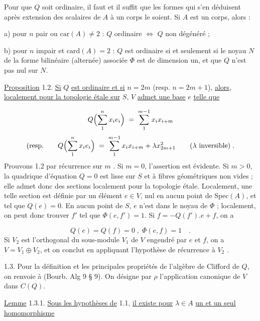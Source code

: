 Pour que $Q$ soit ordinaire, il faut et il suffit que les formes qui s'en déduisent après extension des scalaires de $A$ à un corps le soient. Si $A$ est un corps, alors :

a) pour $n$ pair ou $\mathrm{car}(A) \neq 2$ : $Q$ ordinaire $\Longleftrightarrow$ $Q$ non dégénéré ;

b) pour $n$ impair et $\mathrm{card}(A) = 2$ : $Q$ est ordinaire si et seulement si le noyau $N$ de la forme bilinéaire (alternée) associée $\Phi$ est de dimension un, et que $Q$ n'est pas nul sur $N$.

\underline{Proposition} 1.2. \underline{Si} $Q$ \underline{est ordinaire et si} $n = 2m$ (resp. $n = 2m +1$), \underline{alors}, \underline{localement pour la topologie étale sur} $S$, $V$ \underline{admet une base} \underline{$e$} \underline{telle que} 



\begin{equation*}
 Q\Bigl( \sum_{1}^{n} x_i e_i \Bigr) \;=\; \sum_{1}^{m-1} x_i x_{i+m}
\end{equation*}
\begin{equation*}
\text{(resp.} \qquad Q\Bigl( \sum_{1}^{n} x_i e_i \Bigr) \;=\; \sum_{1}^{m-1} x_i x_{i+m} + \lambda x_{2m+1}^{2} \qquad (\lambda \text{ inversible}) \;.
\end{equation*}
Prouvons 1.2 par récurrence sur $m$ . Si $m = 0$, l'assertion est évidente. Si $m > 0$, la quadrique d'équation $Q = 0$ est lisse sur $S$ et à fibres géométriques non vides ; elle admet donc des sections localement pour la topologie étale. Localement, une telle section est définie par un élément $e \in V$, nul en aucun point de $\mathrm{Spec}(A)$, et tel que $Q(e) = 0$. En aucun point de $S$, $e$ n'est dans le noyau de $\Phi$ ; localement, on peut donc trouver $f'$ tel que $\Phi(e,f') = 1$. Si $f = -Q(f').e+f$, on a

\begin{equation*}
Q(e) = Q(f) = 0 \;,\; \Phi(e,f) = 1 \quad .
\end{equation*}
Si $V_2$ est l'orthogonal du sous-module $V_1$ de $V$ engendré par $e$ et $f$, on a $V = V_1 \oplus V_2$, et on conclut en appliquant l'hypothèse de récurrence à $V_2$ .

1.3. Pour la définition et les principales propriétés de l'algèbre de Clifford de $Q$, on renvoie à (Bourb. Alg 9 \S{} 9). On désigne par $\rho$ l'application canonique de $V$ dans $C(Q)$.

\underline{Lemme} 1.3.1. \underline{Sous les hypothèses de} 1.1, \underline{il existe pour} $\lambda \in A$ \underline{un et un seul homomorphisme}

